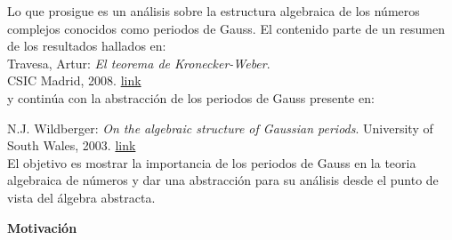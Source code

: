 \documentclass[a5paper]{article}
\begin{document}
\renewcommand{\blockname}{ Estructura algebraica de los periodos de Gauss }

\abstract
{
	Lo que prosigue es un análisis sobre la estructura algebraica de los números complejos conocidos como periodos de Gauss. El contenido parte de un resumen de los resultados hallados en:\\
	Travesa, Artur: {\it El teorema de Kronecker-Weber}. \\ CSIC Madrid, 2008. \href{http://atlas.mat.ub.es/personals/travesa/Kr-W.pdf}{link}\\
	y continúa con la abstracción de los periodos de Gauss presente en:

	N.J. Wildberger: {\it On the algebraic structure of Gaussian periods}. University of South Wales, 2003. \href{http://web.maths.unsw.edu.au/~norman/papers/GaussianPeriods.pdf}{link}\\

	El objetivo es mostrar la importancia de los periodos de Gauss en la teoria algebraica de números y dar una abstracción para su análisis desde el punto de vista del álgebra abstracta.
}
\newpage
\begin{center} {\bf Motivación} \end{center}
\end{document}
